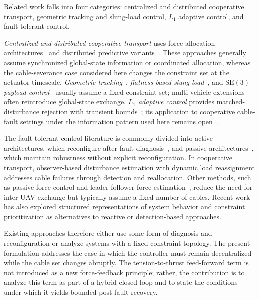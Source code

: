 \documentclass[lettersize,journal]{IEEEtran}
\begin{document}
Related work falls into four categories: centralized and distributed cooperative transport, geometric tracking and slung-load control, $L_1$ adaptive control, and fault-tolerant control.

\textit{Centralized and distributed cooperative transport} uses force-allocation architectures~\cite{Michael2011,Fink2011,Tagliabue2019} and distributed predictive variants~\cite{WangOng2017,LiLoianno2023,PallarLi2025,SuBhowmick2023}. These approaches generally assume synchronized global-state information or coordinated allocation, whereas the cable-severance case considered here changes the constraint set at the actuator timescale. \textit{Geometric tracking}~\cite{LeeLeokMcClamroch2010}, \textit{flatness-based slung-load}~\cite{Sreenath2013}, and $\mathrm{SE}(3)$ \textit{payload control}~\cite{Lee2018} usually assume a fixed constraint set; multi-vehicle extensions~\cite{LeeSreenathKumar2013,SharmaSundaram2023} often reintroduce global-state exchange. \textit{$L_1$ adaptive control} provides matched-disturbance rejection with transient bounds~\cite{CaoHovakimyan2008,Hovakimyan2010book}; its application to cooperative cable-fault settings under the information pattern used here remains open~\cite{WuCheng2025}.

The fault-tolerant control literature is commonly divided into active architectures, which reconfigure after fault diagnosis~\cite{Blanke2015,ZhangJiang2008}, and passive architectures~\cite{Patton1997,Blanke2015}, which maintain robustness without explicit reconfiguration\cite{LiuSuspensionFailure2021}. In cooperative transport, observer-based disturbance estimation with dynamic load reassignment addresses cable failures through detection and reallocation. Other methods, such as passive force control and leader-follower force estimation~\cite{NoCommTransport2021}, reduce the need for inter-UAV exchange but typically assume a fixed number of cables. Recent work has also explored structured representations of system behavior and constraint prioritization as alternatives to reactive or detection-based approaches.~\cite{rulebooks}

Existing approaches therefore either use some form of diagnosis and reconfiguration or analyze systems with a fixed constraint topology. The present formulation addresses the case in which the controller must remain decentralized while the cable set changes abruptly. The tension-to-thrust feed-forward term is not introduced as a new force-feedback principle; rather, the contribution is to analyze this term as part of a hybrid closed loop and to state the conditions under which it yields bounded post-fault recovery.
\end{document}
